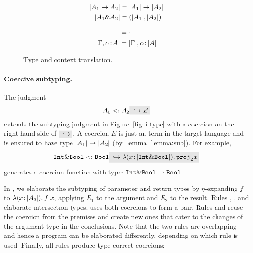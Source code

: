 \begin{figure}[h]

  \begin{align*}
    \lvert A_1 \to A_2 \rvert    &= \lvert A_1 \rvert \to \lvert A_2 \rvert \\
    \lvert A_1 \& A_2 \rvert &= (\lvert A_1 \rvert, \lvert A_2 \rvert) \\
  \end{align*}


  \begin{align*}
    \lvert \cdot \rvert                      &= \cdot \\
    \lvert \Gamma, \alpha \!:\! A \rvert &= \lvert \Gamma \rvert, \alpha \!:\! \lvert A \rvert
  \end{align*}

  \caption{Type and context translation.}
  \label{fig:type-and-context-translation}
\end{figure}


\paragraph{Coercive subtyping.}

The judgment
\[
A_1 \subtype A_2 \yields E
\]
extends the subtyping judgment in Figure~\ref{fig:fi-type} with a coercion
on the right hand side of $ \yields {} $. A coercion $ E $ is just an term
in the target language and is ensured to have type
$ \lvert A_1 \rvert \to \lvert A_2 \rvert $ (by Lemma~\ref{lemma:sub}). For example,
\[
\code{Int} \inter \code{Bool} \subtype \code{Bool} \yields {\lamty x {\im {\code{Int} \inter \code{Bool}}} {\proj 2 x}}
\]
generates a coercion function with type: $\texttt{Int} \& \texttt{Bool} \to \texttt{Bool}$.

In , we elaborate the subtyping of
parameter and return types by $\eta$-expanding $f$ to $\lambda (x \!:\! \lvert A_3 \rvert).\, f \; x$, applying $E_1$ to the argument and $E_2$ to the result. Rules
, , and
 elaborate intersection types.
 uses both coercions to form a pair. Rules
 and  reuse the coercion
from the premises and create new ones that cater to the changes of the argument
type in the conclusions. Note that the two rules are overlapping and
hence a program can be elaborated differently, depending on which rule
is used. Finally, all rules produce type-correct coercions:

